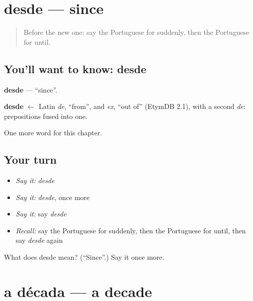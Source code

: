 \section[desde]{desde — since}

\label{lesson:PT-C182-desde}



\begin{quote}
Before the new one: say the Portuguese for suddenly, then the Portuguese for until.
\end{quote}

\subsection*{You'll want to know: desde}
\textbf{desde} — \textquotedblleft{}since\textquotedblright{}.

\begin{cousinweb}
\textbf{desde} $\leftarrow$ Latin \emph{de}, \textquotedblleft{}from\textquotedblright{}, and \emph{ex}, \textquotedblleft{}out of\textquotedblright{} (EtymDB 2.1), with a second \emph{de}: prepositions fused into one.
\end{cousinweb}

\begin{grammarlens}[title={What you've built}]
One more word for this chapter.
\end{grammarlens}

\subsection*{Your turn}
\begin{itemize}
\raggedright
  \item \emph{Say it:} \emph{desde}
  \item \emph{Say it:} \emph{desde}, once more
  \item \emph{Say it:} say \emph{desde}
  \item \emph{Recall:} say the Portuguese for suddenly, then the Portuguese for until, then say \emph{desde} again
\end{itemize}

\begin{tcolorbox}[breakable,colback=teal!4,colframe=teal!35!black,title={Before you move on}]
What does desde mean? (\textquotedblleft{}Since\textquotedblright{}.) Say it once more.
\end{tcolorbox}
\section[a década]{a década — a decade}

